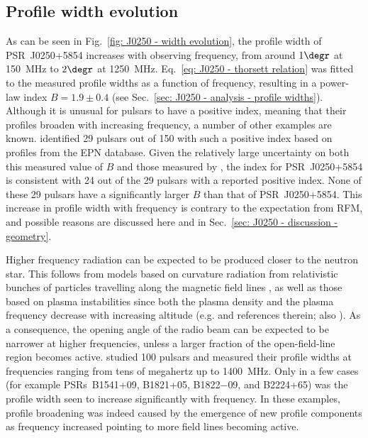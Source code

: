 \subsection{Profile width evolution}
\label{sec: J0250 - discussion - profile width} 
As can be seen in Fig.~\ref{fig: J0250 - width evolution}, the profile width of PSR~J0250+5854 increases with observing frequency, from around $1\degr$ at 150~MHz to $2\degr$ at 1250~MHz. Eq.~\eqref{eq: J0250 - thorsett relation} was fitted to the measured profile widths as a function of frequency, resulting in a power-law index $B = 1.9\pm0.4$ (see Sec.~\ref{sec: J0250 - analysis - profile widths}). Although it is unusual for pulsars to have a positive index, meaning that their profiles broaden with increasing frequency, a number of other examples are known. \citet{CWxx2014} identified 29 pulsars out of 150 with such a positive index based on profiles from the EPN database. Given the relatively large uncertainty on both this measured value of $B$ and those measured by \citet{CWxx2014}, the index for PSR~J0250+5854 is consistent with 24 out of the 29 pulsars with a reported positive index. None of these 29 pulsars have a significantly larger $B$ than that of PSR~J0250+5854. This increase in profile width with frequency is contrary to the expectation from RFM, and possible reasons are discussed here and in Sec.~\ref{sec: J0250 - discussion - geometry}.

Higher frequency radiation can be expected to be produced closer to the neutron star. This follows from models based on curvature radiation from relativistic bunches of particles travelling along the magnetic field lines \citep[e.g.][and references therein]{GLMx2004,DRxx2015}, as well as those based on plasma instabilities since both the plasma density and the plasma frequency decrease with increasing altitude (e.g. \citealt{HAxx2001} and references therein; also \citealt{GGMx2002}). As a consequence, the opening angle of the radio beam can be expected to be narrower at higher frequencies, unless a larger fraction of the open-field-line region becomes active. \citet{PHS+2016} studied 100 pulsars and measured their profile widths at frequencies ranging from tens of megahertz up to 1400~MHz. Only in a few cases (for example PSRs~B1541+09, B1821+05, B1822$-$09, and B2224+65) was the profile width seen to increase significantly with frequency. In these examples, profile broadening was indeed caused by the emergence of new profile components as frequency increased pointing to more field lines becoming active.

